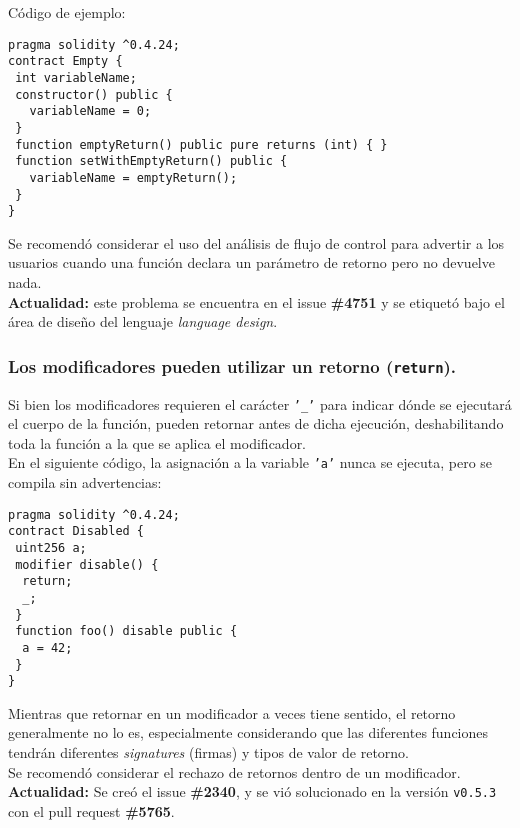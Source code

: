 Código de ejemplo:
\begin{lstlisting}[language=Solidity]
pragma solidity ^0.4.24;
contract Empty {
 int variableName;
 constructor() public {
   variableName = 0;
 }
 function emptyReturn() public pure returns (int) { }
 function setWithEmptyReturn() public {
   variableName = emptyReturn();
 }
}
\end{lstlisting}

Se recomendó considerar el uso del análisis de flujo de control para advertir a los usuarios cuando una función declara un parámetro de retorno pero no devuelve nada.\\

\textbf{Actualidad:} este problema se encuentra en el issue \textbf{\#4751}\cite{GHI4751} y se etiquetó bajo el área de diseño del lenguaje \textit{language design}.\\

\subsubsection{Los modificadores pueden utilizar un retorno (\texttt{return}).}

Si bien los modificadores requieren el carácter \texttt{'\_'} para indicar dónde se ejecutará el cuerpo de la función, pueden retornar antes de dicha ejecución, deshabilitando toda la función a la que se aplica el modificador.\\

En el siguiente código, la asignación a la variable \texttt{'a'} nunca se ejecuta, pero se compila sin advertencias:
\begin{lstlisting}[language=Solidity]
pragma solidity ^0.4.24;
contract Disabled {
 uint256 a;
 modifier disable() {
  return;
  _;
 }
 function foo() disable public {
  a = 42;
 }
}
\end{lstlisting}

Mientras que retornar en un modificador a veces tiene sentido, el retorno generalmente no lo es, especialmente considerando que las diferentes funciones tendrán diferentes \textit{signatures} (firmas) y tipos de valor de retorno.\\

Se recomendó considerar el rechazo de retornos dentro de un modificador.\\

\textbf{Actualidad:} Se creó el issue \textbf{\#2340}\cite{GHI2340}, y se vió solucionado en la versión \texttt{v0.5.3} con el pull request \textbf{\#5765}\cite{GHPR5765}.\\

